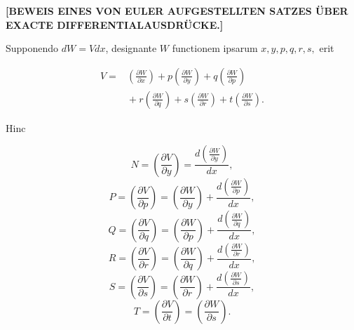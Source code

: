 \begin{center}\textbf{[BEWEIS EINES VON EULER AUFGESTELLTEN SATZES ÜBER EXACTE DIFFERENTIALAUSDRÜCKE.]}\end{center}



\noindent\hspace*{\parindent}Supponendo $dW = Vdx$, designante $W$ functionem ipsarum $x, y, p, q, r, s,$ erit

\[
\begin{aligned}V ={}&\left(\frac{\partial W}{\partial x}\right) + p\left(\frac{\partial W}{\partial y}\right) + q\left(\frac{\partial W}{\partial p}\right) \\ &{}+ r\left(\frac{\partial W}{\partial q}\right) + s\left(\frac{\partial W}{\partial r}\right) + t\left(\frac{\partial W}{\partial s}\right).
\end{aligned}
\]

\par\noindent Hinc

\[
N = \left(\frac{\partial V}{\partial y}\right) = \frac{d\left(\frac{\partial W}{\partial y}\right)}{dx},
\]
\[
P = \left(\frac{\partial V}{\partial p}\right) = \left(\frac{\partial W}{\partial y}\right) + \frac{d\left(\frac{\partial W}{\partial p}\right)}{dx},
\]
\[
Q = \left(\frac{\partial V}{\partial q}\right) = \left(\frac{\partial W}{\partial p}\right) + \frac{d\left(\frac{\partial W}{\partial q}\right)}{dx},
\]
\[
R = \left(\frac{\partial V}{\partial r}\right) = \left(\frac{\partial W}{\partial q}\right) + \frac{d\left(\frac{\partial W}{\partial r}\right)}{dx},
\]
\[
S = \left(\frac{\partial V}{\partial s}\right) = \left(\frac{\partial W}{\partial r}\right) + \frac{d\left(\frac{\partial W}{\partial s}\right)}{dx},
\]
\[
T = \left(\frac{\partial V}{\partial t}\right) = \left(\frac{\partial W}{\partial s}\right).
\]

